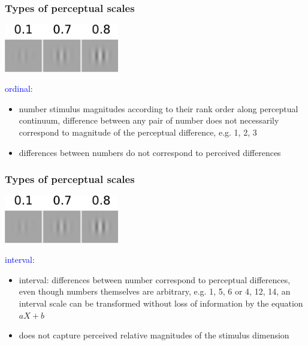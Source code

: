 \documentclass[]{beamer}
\begin{document}
\begin{frame}
 \frametitle{Types of perceptual scales}
\begin{overlayarea}{110mm}{60mm}
\begin{center}
\includegraphics[width=50mm]{figs/l6/three_contrasts.png} 
\end{center}

\textcolor{blue}{ordinal:}
\begin{itemize}
 \item  number stimulus magnitudes according to their rank order along perceptual continuum, difference between any pair of number does not necessarily correspond to magnitude of the perceptual difference, e.g. 1, 2, 3 
 \item differences between numbers do not correspond to perceived differences
\end{itemize}
\end{overlayarea}
\end{frame}


\begin{frame}
 \frametitle{Types of perceptual scales}
\begin{overlayarea}{110mm}{60mm}
\begin{center}
\includegraphics[width=50mm]{figs/l6/three_contrasts.png} 
\end{center}

\textcolor{blue}{interval:}
\begin{itemize}
 \item interval: differences between number correspond to perceptual differences, even though numbers themselves are arbitrary, e.g. 1, 5, 6 or 4, 12, 14, an interval scale can be transformed without loss of information by the equation $aX+b$
 \item does not capture perceived relative magnitudes of the stimulus dimension
\end{itemize}
\end{overlayarea}
\end{frame}
\end{document}
